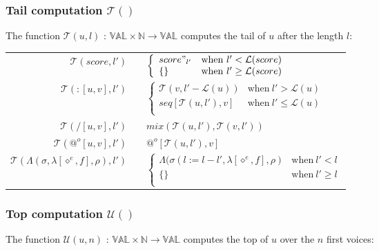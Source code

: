 \documentclass[10pt,a4paper,frenchb]{article}
\makeatletter
\newcommand{\var}[1]{\diamond^#1}
\newcommand{\es}{\{\}}
\newcommand{\val}{\mathbb{VAL}}
\newcommand{\closure}{\Lambda}
\newcommand{\noredex}{@^o}
\newcommand{\bdomain}[3]{$#1 \times #2 \rightarrow #3$}
\newcommand{\envsym}{\rho}
\newcommand{\closenv}[3][\var{e}]{\closure(#3,\lambda[#1,#2],\envsym)}
\newcommand{\seq}			{:}
\newcommand{\length}		{{\mathcal L}}
\newcommand{\tail}			{{\mathcal T}}
\renewcommand{\top}		{{\mathcal U}}
\newcommand{\bounds}		{\sigma}
\makeatother
\begin{document}
\subsubsection{Tail computation $\tail()$}
The function $\tail(u,l)$ :  \bdomain{\val}{\mathbb{N}}{\val} computes the tail of $u$ after the length $l$:

\begin{center}
\begin{tabular*}{12cm}{rc@{ $\rightarrow$ }l}
 \hline
 $\tail(score,l')$				& & $\left\{ \begin{array}{ll}
 								score"_{l'} & \mathrm{when} \  l' < \length(score) \\
								\es & \mathrm{when} \  l' \geq \length(score) \\
	 							\end{array} \right.$ \\
 $\tail(\seq [u,v],l')$		& & $\left\{ \begin{array}{ll}
 								\tail(v,l'-\length(u)) & \mathrm{when} \  l' > \length(u) \\
								seq[\tail(u, l'),v] & \mathrm{when} \  l' \leq \length(u) \\
	 							\end{array} \right.$ \\
 $\tail(/ [u,v],l')$ 			& & $mix(\tail(u, l'), \tail(v, l'))$ \\
 $\tail(\noredex [u,v],l')$ 	& & $\noredex[\tail(u,l'),v]$ \\
 $\tail(\closenv{f}{\bounds},l')$ 	& &  $\left\{ \begin{array}{ll}
 								\closenv{f}{\bounds(l:= l-l'} & \mathrm{when} \  l' < l \\
								\es & \mathrm{when} \  l' \geq l \\
	 							\end{array} \right.$ \\
 \hline
\end{tabular*}
\end{center}

\subsubsection{Top computation $\top()$}
The function $\top(u,n)$ :  \bdomain{\val}{\mathbb{N}}{\val} computes the top of $u$ over the $n$ first voices:
\end{document}
